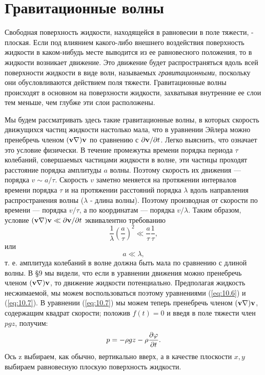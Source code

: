 \section{Гравитационные волны}
\label{sec:12}

Свободная поверхность жидкости, находящейся в равновесии в поле тяжести, -
плоская. Если под влиянием какого-либо внешнего воздействия поверхность жидкости
в каком-нибудь месте выводится из ее равновесного положения, то в жидкости
возникает движение. Это движение будет распространяться вдоль всей поверхности
жидкости в виде волн, называемых \textit{гравитационными}, поскольку они
обусловливаются действием поля тяжести. Гравитационные волны происходят в
основном на поверхности жидкости, захватывая внутренние ее слои тем меньше, чем
глубже эти слои расположены.

Мы будем рассматривать здесь такие гравитационные волны, в которых скорость
движущихся частиц жидкости настолько мала, что в уравнении Эйлера можно
пренебречь членом $({\mathbf{v}} \nabla) {\mathbf{v}}$ по сравнению с $\partial { \mathbf{v} }/\partial t$. Легко
выяснить, что означает это условие физически. В течение промежутка времени
порядка периода $\tau$ колебаний, совершаемых частицами жидкости в волне, эти
частицы проходят расстояние порядка амплитуды $a$ волны. Поэтому скорость их
движения — порядка $v \sim a/\tau$. Скорость $v$ заметно меняется на протяжении
интервалов времени порядка $\tau$ и на протяжении расстояний порядка $\lambda$
вдоль направления распространения волны ($\lambda$ - длина волны). Поэтому
производная от скорости по времени — порядка $v/\tau$, а по координатам —
порядка $v/\lambda$. Таким образом, условие $({\mathbf{v}} \nabla) {\mathbf{v}} \ll \partial { \mathbf{v} }/\partial t$
эквивалентно требованию
\[
   \frac1{\lambda} \left( \frac{a}{\tau} \right)^2 \ll \frac{a}{\tau}\frac1{\tau},
\]
или
\begin{equation}
 \label{eq:12.1}
    a \ll \lambda,
\end{equation}
т. е. амплитуда колебаний в волне должна быть мала по сравнению с длиной волны.
В \S9 мы видели, что если в уравнении движения можно пренебречь членом $({\mathbf{v}} \nabla) {\mathbf{v}}$,
то движение жидкости потенциально. Предполагая жидкость несжимаемой, мы можем
воспользоваться поэтому уравнениями (\ref{eq:10.6}) и (\ref{eq:10.7}). В уравнении (\ref{eq:10.7}) мы можем
теперь пренебречь членом $({\mathbf{v}} \nabla) {\mathbf{v}}$, содержащим квадрат скорости; положив $f(t) = 0$
и введя в поле тяжести член $pgz$, получим:
\begin{equation}
 \label{eq:12.2}
  p = - \rho gz - \rho \frac{\partial{\varphi}}{\partial{t}}.
\end{equation}
Ось z выбираем, как обычно, вертикально вверх, а в качестве плоскости $x,y$
выбираем равновесную плоскую поверхность жидкости.

